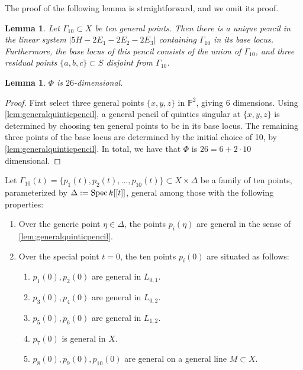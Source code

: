 \documentclass[reqno, 11pt]{amsart}
\theoremstyle{definition}
\theoremstyle{remark}
\numberwithin{equation}{section}
\numberwithin{thm}{section}
\numberwithin{prop}{section}
\numberwithin{lem}{section}
\numberwithin{cor}{section}
\numberwithin{conj}{section}
\numberwithin{defn}{section}
\newcommand{\Spec}{{\text{\rm Spec}\,}}
\theoremstyle{plain}
\newtheorem{lemma}[theorem]{Lemma}
\theoremstyle{definition}
\newcommand\bp{{\mathbb P}}
\begin{document}
The proof of the following lemma is straightforward, and we omit its proof.
\begin{lemma}\label{lem:generalquinticpencil}
Let $\Gamma_{10} \subset X$ be ten general points. Then there is a unique pencil in the linear system $|5H - 2E_{1} - 2E_{2} - 2E_{3}|$ containing $\Gamma_{10}$  in its base locus.  Furthermore, the base locus of this pencil consists of the union of  $\Gamma_{10}$, and three residual points $\{a,b,c\} \subset S$ disjoint from $\Gamma_{10}$.
\end{lemma}

\begin{lemma}\label{lem:dimensionPhi}
$\Phi$ is $26$-dimensional.
\end{lemma} 
\begin{proof}
	First select three general points $\{x,y,z\}$ in $\bp^{2}$, giving $6$ dimensions. Using \autoref{lem:generalquinticpencil}, a general pencil of quintics singular at $\{x,y,z\}$ is determined by choosing ten general points to be in its base locus. The remaining three points of the base locus are determined
	by the initial choice of 10, by \autoref{lem:generalquinticpencil}. In total, we have that $\Phi$ is $26 = 6 + 2 \cdot 10$ dimensional.
\end{proof}



Let $\Gamma_{10}(t) = \{p_{1}(t), p_{2}(t), ... , p_{10}(t)\} \subset X \times \Delta$ be a family of ten points, parameterized by $\Delta := \Spec k[[t]]$, general among those with the following properties:

\begin{enumerate}
\item Over the generic point $\eta \in \Delta$, the points $p_{i}(\eta)$ are general in the sense of \autoref{lem:generalquinticpencil}. 

\item Over the special point $t=0$, the ten points $p_{i}(0)$ are situated as follows: 

\begin{enumerate}
\item $p_{1}(0), p_{2}(0)$ are general in $L_{0,1}$.
\item $p_{3}(0), p_{4}(0)$ are general in $L_{0,2}$.
\item $p_{5}(0), p_{6}(0)$ are general in $L_{1,2}$.
\item $p_{7}(0)$ is general in $X$.
\item $p_{8}(0), p_{9}(0), p_{10}(0)$ are general on a general line $M \subset X$.
\end{enumerate}
\end{enumerate}
\end{document}
